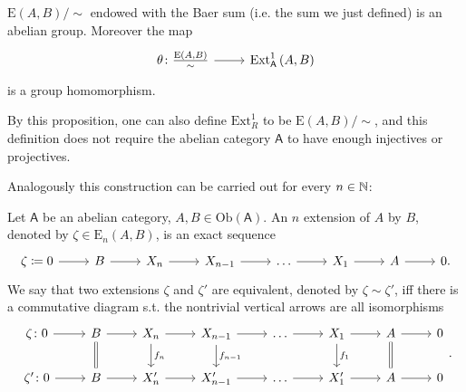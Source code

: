 \begin{prop}
	$\mathrm{E}(A,B)/\sim$ endowed with the Baer sum (i.e$.$ the sum we just defined)
	is an abelian group.
	Moreover the map 
	\begin{equation*}
	\begin{tikzcd}[row sep = 0ex
		,/tikz/column 1/.append style={anchor=base east}
		,/tikz/column 2/.append style={anchor=base west}]
		\theta\colon \frac{\mathrm{E}(A,B)}{\sim} \arrow[r, "", rightarrow] &
		\mathrm{Ext}^{ 1}_{ \mathsf{A}} \left( A, B \right)
	\end{tikzcd}
	\end{equation*} 
	is a group homomorphism.
\end{prop} 
By this proposition, one can also define $\mathrm{Ext}^1_R$
to be $\mathrm{E}(A,B)/\sim$, and this definition does not require the 
abelian category $\mathsf{A}$ to have enough injectives or projectives.

Analogously this construction can be carried out for every $n \in \mathbb{N}$:
\begin{defn}[$n$ extension]
	Let $\mathsf{A}$ be an abelian category, $A,B \in \mathrm{Ob} \left(\mathsf{A}\right)$.
	An $n$ extension of $A$ by $B$, denoted by $\zeta \in \mathrm{E}_n(A,B)$, is an exact sequence
	\begin{equation*}
	\begin{tikzcd}
		\zeta \coloneqq 0 \arrow[r, "", rightarrow] &
		B \arrow[r, "", rightarrow] &
		X_n \arrow[r, "", rightarrow] &
		X_{n-1} \arrow[r, "", rightarrow] &
		\ldots \arrow[r, "", rightarrow] &
		X_1 \arrow[r, "", rightarrow] &
		A \arrow[r, "", rightarrow] &
		0
	.\end{tikzcd}
	\end{equation*}
	We say that two extensions $\zeta$ and $\zeta'$ are equivalent, denoted by $\zeta \sim \zeta'$,
	iff there is a commutative diagram s.t. the nontrivial vertical arrows are all isomorphisms
	\begin{equation*}
	\begin{tikzcd}
		\zeta \colon
		0 \arrow[r, "", rightarrow] &
		B \arrow[r, "", rightarrow] \arrow[d, "", equal] &
		X_n \arrow[r, "", rightarrow] \arrow[d, "f_n", rightarrow] &
		X_{n-1} \arrow[r, "", rightarrow] \arrow[d, "f_{n-1}", rightarrow] &
		\ldots \arrow[r, "", rightarrow] &
		X_1 \arrow[r, "", rightarrow] \arrow[d, "f_1", rightarrow] &
		A \arrow[r, "", rightarrow] \arrow[d, "", equal] &
		0\\
		\zeta' \colon
		0 \arrow[r, "", rightarrow] &
		B \arrow[r, "", rightarrow] &
		X'_n \arrow[r, "", rightarrow] &
		X'_{n-1} \arrow[r, "", rightarrow] &
		\ldots \arrow[r, "", rightarrow] &
		X'_1 \arrow[r, "", rightarrow] &
		A \arrow[r, "", rightarrow] &
		0
	\end{tikzcd}
	.\end{equation*} 
\end{defn}

